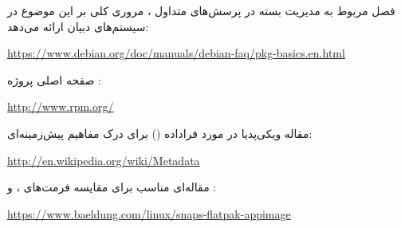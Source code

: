 فصل مربوط به مدیریت بسته در پرسش‌های متداول ، مروری کلی بر این موضوع در سیستم‌های دبیان ارائه می‌دهد:

\begin{latin}
\url{https://www.debian.org/doc/manuals/debian-faq/pkg-basics.en.html}
\end{latin}

صفحه اصلی پروژه :

\begin{latin}
\url{http://www.rpm.org/}
\end{latin}

مقاله ویکی‌پدیا در مورد فراداده () برای درک مفاهیم پیش‌زمینه‌ای:

\begin{latin}
\url{http://en.wikipedia.org/wiki/Metadata}
\end{latin}

مقاله‌ای مناسب برای مقایسه فرمت‌های ،  و :

\begin{latin}
\url{https://www.baeldung.com/linux/snaps-flatpak-appimage}
\end{latin}